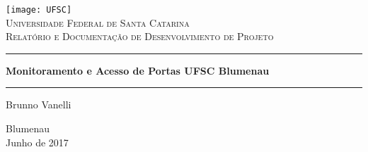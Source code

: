 

\begin{center}
\thispagestyle{empty}
\texttt{[image: UFSC]} \\[0.3cm]
\textsc{\LARGE Universidade Federal de Santa Catarina}\\[4cm]

\textsc{\large Relatório e Documentação de Desenvolvimento de Projeto}\\[0.5cm]
\hrule \vspace{0.4cm}
{ \huge \bfseries Monitoramento e Acesso de Portas UFSC Blumenau  \\[0.4cm] }
\hrule \vspace{1.5cm}
\vspace{5cm} %

\begin{minipage}{0.5\textwidth}
\begin{flushleft} \large

\end{flushleft}
\end{minipage}
\begin{minipage}{0.4\textwidth}
\begin{flushright} \large
Brunno Vanelli
\end{flushright}
\end{minipage}

\vfill

{\large Blumenau \\[0.4cm] Junho de 2017}

\end{center}



\newpage
\tableofcontents
\newpage
